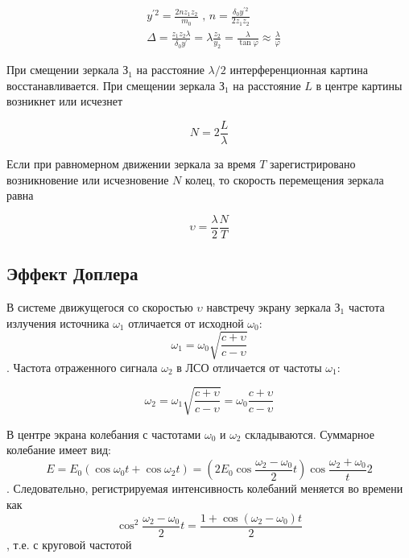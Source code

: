 \documentclass[a4paper,12pt]{article}
\begin{document}
	\begin{equation}
	\begin{aligned}
	&y^{'2} = \frac{2nz_1z_2}{m_0} \text{ , } n=\frac{\delta_0y^{'2}}{2z_1z_2}\\
	&\Delta = \frac{z_1z_2\lambda}{\delta_0y^{'}} = \lambda\frac{z_2}{y_2} = \frac{\lambda}{\tan\varphi} \approx \frac{\lambda}{\varphi}
	\end{aligned}
	\end{equation}
	
	При смещении зеркала $\text{З}_1$ на расстояние $\lambda/2$ интерференционная картина восстанавливается. При смещении зеркала $\text{З}_1$ на расстояние $L$ в центре картины возникнет или исчезнет
	
	\begin{equation}\label{eq:N}
	N = 2\frac{L}{\lambda}
	\end{equation}
	
	Если при равномерном движении зеркала за время $T$ зарегистрировано возникновение или исчезновение $N$ колец, то скорость перемещения зеркала равна
	
	\begin{equation}\label{eq:speed}
	\upsilon = \frac{\lambda}{2}\frac{N}{T}
	\end{equation}  
	
	\subsection{Эффект Доплера}
	
	В системе движущегося со скоростью $\upsilon$ навстречу экрану зеркала $\text{З}_1$ частота излучения источника $\omega_1$ отличается от исходной $\omega_0$: \[ \omega_1 = \omega_0\sqrt{\frac{c+\upsilon}{c-\upsilon}} \]. Частота отраженного сигнала $\omega_2$ в ЛСО отличается от частоты $\omega_1$:
	
	\begin{equation}\label{eq:freq}
	\omega_2 = \omega_1\sqrt{\frac{c+\upsilon}{c-\upsilon}} = \omega_0\frac{c+\upsilon}{c-\upsilon}
	\end{equation}
	
	В центре экрана колебания с частотами $\omega_0$ и $\omega_2$ складываются. Суммарное колебание имеет вид: \[ E = E_0(\cos\omega_0t + \cos\omega_2t) = \left(2E_0\cos\frac{\omega_2-\omega_0}{2}t\right)\cos\frac{\omega_2+\omega_0}t{2} \]. Следовательно, регистрируемая интенсивность колебаний меняется во времени как \[ \cos^2\frac{\omega_2-\omega_0}{2}t = \frac{1+\cos(\omega_2 - \omega_0)t}{2} \], т.е. с круговой частотой
	
\end{document}
